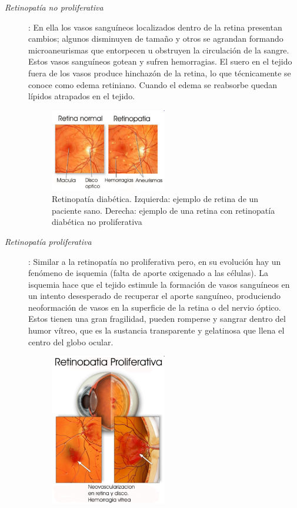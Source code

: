 \begin{description}
	\item[\normalfont\textit{Retinopat\'ia no proliferativa}]: En ella los vasos sangu\'ineos localizados dentro de la retina presentan cambios; algunos disminuyen de tamaño y otros se agrandan formando microaneurismas que entorpecen u obstruyen la circulaci\'on de la sangre. Estos vasos sangu\'ineos gotean y sufren hemorragias. El suero en el tejido fuera de los vasos produce hinchaz\'on de la retina, lo que t\'ecnicamente se conoce como edema retiniano. Cuando el edema se reabsorbe quedan l\'ipidos atrapados en el tejido.\cite{walter2002contribution} \cite{spencer1996image}
\begin{figure}[H]
	{
	\centering
	\includegraphics[width=0.5\textwidth]{Figures/Retinopatia}
	\caption[Retinopat\'ia]{Retinopat\'ia diab\'etica. Izquierda: ejemplo de retina de un paciente sano. Derecha: ejemplo de una retina con retinopat\'ia diab\'etica no proliferativa}
	\label{fig:Retinopatia}
	}
\end{figure}
\item[\normalfont\textit{Retinopat\'ia proliferativa}]: Similar a la retinopat\'ia no proliferativa pero, en su evoluci\'on hay un fen\'omeno de isquemia (falta de aporte oxigenado a las c\'elulas). La isquemia hace que el tejido estimule la formaci\'on de vasos sangu\'ineos en un intento desesperado de recuperar el aporte sangu\'ineo, produciendo neoformaci\'on de vasos en la superficie de la retina o del nervio \'optico. Estos tienen una gran fragilidad, pueden romperse y sangrar dentro del humor v\'itreo, que es la sustancia transparente y gelatinosa que llena el centro del globo ocular.\cite{walter2002contribution} \cite{spencer1996image}
\begin{figure}[H]
	{
	\centering
	\includegraphics[width=0.5\textwidth]{Figures/RetinopatiaPrliferativa}
}
\end{figure}
\end{description}
